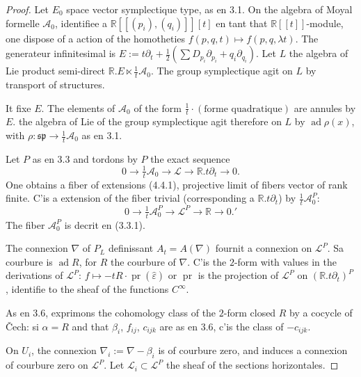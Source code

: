 \documentclass[11pt,a4paper]{article}
\theoremstyle{plain}
\theoremstyle{definition}
\DeclareMathOperator{\ad}{ad}
\DeclareMathOperator{\pr}{pr}
\newcommand{\R}{\mathbb{R}}
\begin{document}
\begin{proof}
Let $E_{0}$ space vector symplectique type, as en 3.1. On the algebra
of Moyal formelle $\mathcal{A}_{0}$, identifiee a $\R[[(p_{i}),(q_{i})]][t]$ en tant that $\R[[t]]$-module, one dispose of a action of the homotheties $f(p,q,t) \mapsto f(p,q,\lambda t)$. The generateur infinitesimal is $E := t\partial_{t} + \tfrac{1}{2}(\sum D_{p_{i}}\partial_{p_{i}} + q_{i}\partial_{q_{i}})$. Let $L$ the algebra of Lie product semi-direct $\R.E \ltimes \tfrac{1}{t}\mathcal{A}_{0}$. The group symplectique agit on $L$ by transport of structures.

It fixe $E$. The elements of $\mathcal{A}_{0}$ of the form $\tfrac{1}{t} \cdot (\text{forme quadratique})$ are annules by $E$. the algebra of Lie of the group symplectique agit therefore on $L$ by $\ad \rho(x)$, with $\rho: \mathfrak{sp} \to \tfrac{1}{t}\mathcal{A}_{0}$ as en 3.1.

Let $P$ as en 3.3 and tordons by $P$ the exact sequence
\begin{equation}
0 \longrightarrow \tfrac{1}{t}\mathcal{A}_{0} \longrightarrow \mathcal{L} \longrightarrow \R.t\partial_{t} \longrightarrow 0. \tag{4.4.1}
\end{equation}
One obtains a fiber of extensions (4.4.1), projective limit of fibers vector of
rank finite. C'is a extension of the fiber trivial (corresponding a $\R.t\partial_{t}$) by $\tfrac{1}{t}\mathcal{A}_{0}^{P}$:
\begin{equation}
0 \longrightarrow \tfrac{1}{t}\mathcal{A}_{0}^{P} \longrightarrow \mathcal{L}^{P} \longrightarrow \R \longrightarrow 0. \tag{4.4.1}'
\end{equation}
The fiber $\mathcal{A}_{0}^{P}$ is decrit en (3.3.1).

The connexion $\nabla$ of $P_{L}$ definissant $A_{t} = A(\nabla)$ fournit a connexion on $\mathcal{L}^{P}$.
Sa courbure is $\ad R$, for $R$ the courbure of $\nabla$. C'is the $2$-form with values in the derivations of $\mathcal{L}^{P}$: $f \longmapsto -tR \cdot \pr(\hat{\varepsilon})$
or $\pr$ is the projection of $\mathcal{L}^{P}$ on $(\R.t\partial_{t})^{P}$, identifie to the sheaf of the functions $C^{\infty}$.

As en 3.6, exprimons the cohomology class of the $2$-form closed $R$
by a cocycle of \v{C}ech: si $\alpha = R$ and that $\beta_{i}$, $f_{ij}$, $c_{ijk}$ are as en 3.6, c'is the class of $-c_{ijk}$.

On $U_{i}$, the connexion $\nabla_{i} := \nabla - \beta_{i}$ is of courbure zero, and induces a connexion of courbure zero on $\mathcal{L}^{P}$. Let $\mathcal{L}_{i} \subset \mathcal{L}^{P}$ the sheaf of the sections horizontales.


\end{proof}
\end{document}
